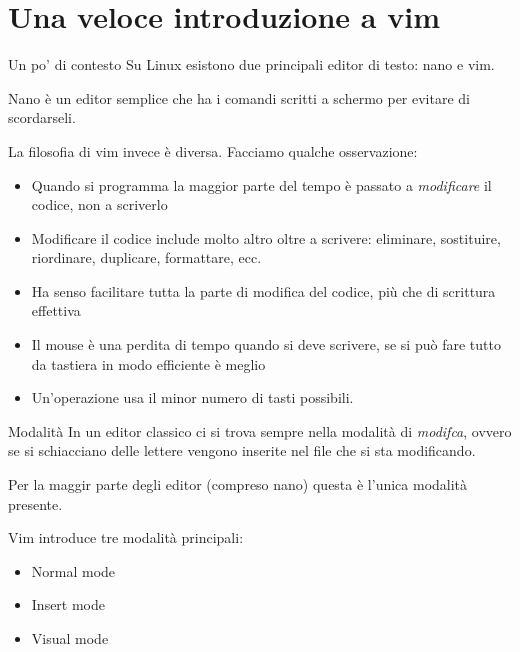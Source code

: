 \documentclass{beamer}
\begin{document}
\section{Una veloce introduzione a vim}
\begin{frame}[fragile]{Un po' di contesto}
  Su Linux esistono due principali editor di testo: nano e vim. \smallskip

  Nano è un editor semplice che ha i comandi scritti a schermo per evitare di
  scordarseli. \smallskip \pause

  La filosofia di vim invece è diversa. Facciamo qualche osservazione: \pause
  \begin{itemize}[<+->]
    \item Quando si programma la maggior parte del tempo è passato a 
      \textit{modificare} il codice, non a scriverlo

    \item Modificare il codice include molto altro oltre a scrivere: eliminare,
      sostituire, riordinare, duplicare, formattare, ecc.

    \item Ha senso facilitare tutta la parte di modifica del codice, più che 
      di scrittura effettiva

    \item Il mouse è una perdita di tempo quando si deve scrivere, se si può
      fare tutto da tastiera in modo efficiente è meglio

    \item Un'operazione usa il minor numero di tasti possibili.
  \end{itemize}
\end{frame}

\begin{frame}{Modalità}
  In un editor classico ci si trova sempre nella modalità di \textit{modifca},
  ovvero se si schiacciano delle lettere vengono inserite nel file che si sta 
  modificando. \medskip \pause 

  Per la maggir parte degli editor (compreso nano) questa è l'unica modalità 
  presente. \medskip \pause

  Vim introduce tre modalità principali:
  \begin{itemize}
    \item Normal mode
    \item Insert mode
    \item Visual mode
  \end{itemize}
\end{frame}
\end{document}
